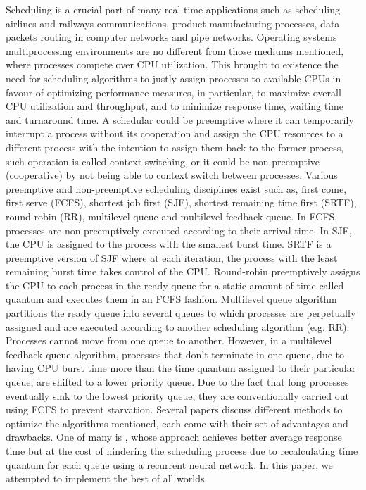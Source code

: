 \documentclass[conference]{IEEEtran}
\begin{document}
Scheduling is a crucial part of many real-time applications such as scheduling airlines and railways communications, product manufacturing processes, data packets routing in computer networks and pipe networks. Operating systems multiprocessing environments are no different from those mediums mentioned, where processes compete over CPU utilization. This brought to existence the need for scheduling algorithms to justly assign processes to available CPUs in favour of optimizing performance measures, in particular, to maximize overall CPU utilization and throughput, and to minimize response time, waiting time and turnaround time. A schedular could be preemptive where it can temporarily interrupt a process without its cooperation and assign the CPU resources to a different process with the intention to assign them back to the former process, such operation is called context switching, or it could be non-preemptive (cooperative) by not being able to context switch between processes. Various preemptive and non-preemptive scheduling disciplines exist such as, first come, first serve (FCFS), shortest job first (SJF), shortest remaining time first (SRTF), round-robin (RR), multilevel queue and multilevel feedback queue. In FCFS, processes are non-preemptively executed according to their arrival time. In SJF, the CPU is assigned to the process with the smallest burst time. SRTF is a preemptive version of SJF where at each iteration, the process with the least remaining burst time takes control of the CPU. Round-robin preemptively assigns the CPU to each process in the ready queue for a static amount of time called quantum and executes them in an FCFS fashion. Multilevel queue algorithm partitions the ready queue into several queues to which processes are perpetually assigned and are executed according to another scheduling algorithm (e.g. RR). Processes cannot move from one queue to another. However, in a multilevel feedback queue algorithm, processes that don't terminate in one queue, due to having CPU burst time more than the time quantum assigned to their particular queue, are shifted to a lower priority queue. Due to the fact that long processes eventually sink to the lowest priority queue, they are conventionally carried out using FCFS to prevent starvation. Several papers discuss different methods to optimize the algorithms mentioned, each come with their set of advantages and drawbacks. One of many is \cite{b2}, whose approach achieves better average response time but at the cost of hindering the scheduling process due to recalculating time quantum for each queue using a recurrent neural network. In this paper, we attempted to implement the best of all worlds.
\end{document}
